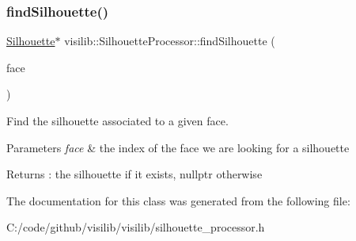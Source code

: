 \subsubsection{\texorpdfstring{findSilhouette()}{findSilhouette()}}
{\footnotesize\ttfamily \mbox{\hyperlink{classvisilib_1_1_silhouette}{Silhouette}}$\ast$ visilib\+::\+Silhouette\+Processor\+::find\+Silhouette (\begin{DoxyParamCaption}\item[{\mbox{\hyperlink{classvisilib_1_1_silhouette_mesh_face}{Silhouette\+Mesh\+Face}} $\ast$}]{face }\end{DoxyParamCaption})\hspace{0.3cm}{\ttfamily [inline]}}



Find the silhouette associated to a given face. 


\begin{DoxyParams}{Parameters}
{\em face} & the index of the face we are looking for a silhouette \\
\hline
\end{DoxyParams}
\begin{DoxyReturn}{Returns}
\+: the silhouette if it exists, nullptr otherwise 
\end{DoxyReturn}


The documentation for this class was generated from the following file\+:\begin{DoxyCompactItemize}
\item 
C\+:/code/github/visilib/visilib/silhouette\+\_\+processor.\+h\end{DoxyCompactItemize}
